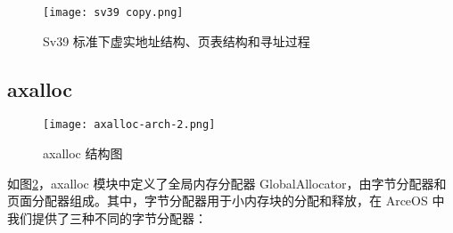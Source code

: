 \begin{figure}
  \centering
  \texttt{[image: sv39 copy.png]}
  \caption{Sv39 标准下虚实地址结构、页表结构和寻址过程}
  \label{fig:sv39}
\end{figure}


\subsection{axalloc}

\begin{figure}
  \centering
  \texttt{[image: axalloc-arch-2.png]}
  \caption{axalloc 结构图}
  \label{fig:axalloc-arch}
\end{figure}

如图\ref{fig:axalloc-arch}，axalloc 模块中定义了全局内存分配器 GlobalAllocator，由字节分配器和页面分配器组成。其中，字节分配器用于小内存块的分配和释放，在 ArceOS 中我们提供了三种不同的字节分配器：

